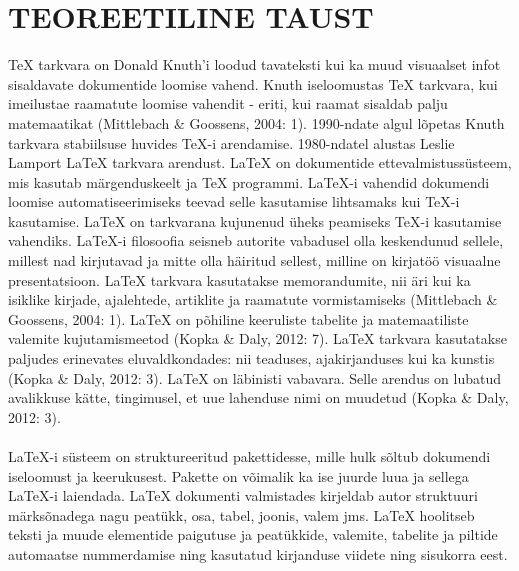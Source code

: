 \documentclass{21kuur}
\begin{document}
\chapter{TEOREETILINE TAUST}
TeX tarkvara on Donald Knuth'i loodud tavateksti kui ka muud visuaalset infot sisaldavate dokumentide loomise vahend. Knuth iseloomustas TeX tarkvara, kui imeilustae raamatute loomise vahendit - eriti, kui raamat sisaldab palju matemaatikat (Mittlebach \& Goossens, 2004: 1). 1990-ndate algul lõpetas Knuth tarkvara stabiilsuse huvides TeX-i arendamise. 1980-ndatel alustas Leslie Lamport LaTeX tarkvara arendust. LaTeX on dokumentide ettevalmistussüsteem, mis kasutab märgenduskeelt ja TeX programmi. LaTeX-i vahendid dokumendi loomise automatiseerimiseks teevad selle kasutamise lihtsamaks kui TeX-i kasutamise. LaTeX on tarkvarana kujunenud üheks peamiseks TeX-i kasutamise vahendiks. LaTeX-i filosoofia seisneb autorite vabadusel olla keskendunud sellele, millest nad kirjutavad ja mitte olla häiritud sellest, milline on kirjatöö visuaalne presentatsioon. LaTeX tarkvara kasutatakse memorandumite, nii äri kui ka isiklike kirjade, ajalehtede, artiklite ja raamatute vormistamiseks (Mittlebach \& Goossens, 2004: 1). LaTeX on põhiline keeruliste tabelite ja matemaatiliste valemite kujutamismeetod (Kopka \& Daly, 2012: 7). LaTeX tarkvara kasutatakse paljudes erinevates eluvaldkondades: nii teaduses, ajakirjanduses kui ka kunstis (Kopka \& Daly, 2012: 3). LaTeX on läbinisti vabavara. Selle arendus on lubatud avalikkuse kätte, tingimusel, et uue lahenduse nimi on muudetud (Kopka \& Daly, 2012: 3). 
\\\\LaTeX-i süsteem on struktureeritud pakettidesse, mille hulk sõltub dokumendi iseloomust ja keerukusest. Pakette on võimalik ka ise juurde luua ja sellega LaTeX-i laiendada. LaTeX dokumenti valmistades kirjeldab autor struktuuri märksõnadega nagu peatükk, osa, tabel, joonis, valem jms. LaTeX hoolitseb teksti ja muude elementide paigutuse ja peatükkide, valemite, tabelite ja piltide automaatse nummerdamise ning kasutatud kirjanduse viidete ning sisukorra eest.
\end{document}
